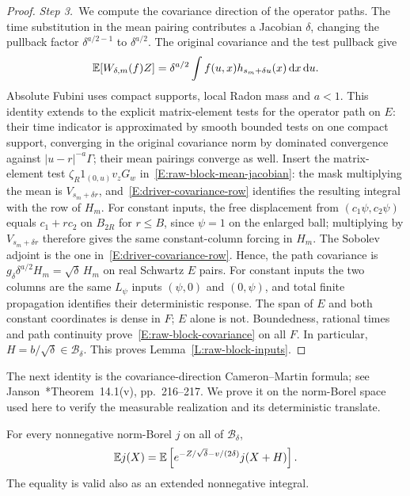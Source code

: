 \begin{proof}
  \medskip
  \noindent\textit{Step 3.~}We compute the covariance direction of the
  operator paths.
  The time substitution in the mean pairing contributes a Jacobian $\delta$,
  changing the pullback factor $\delta^{a/2-1}$ to $\delta^{a/2}$.
  The original covariance and the test pullback give
  \begin{equation}\label{E:raw-block-mean-jacobian}
    \mathbb{E}[W_{\delta,m}(f)Z]
    =\delta^{a/2}\int f(u,x)h_{s_m+\delta u}(x)\,\mathrm{d} x\,\mathrm{d} u.
  \end{equation}
  Absolute Fubini uses compact supports, local Radon mass and $a < 1$. This
  identity extends to the explicit matrix-element tests for the operator path on
  $E$: their time indicator is approximated by smooth bounded tests on one
  compact support, converging in the original covariance norm by dominated
  convergence against $|u-r|^{-a}\Gamma$; their mean pairings converge as well.
  Insert the matrix-element test $\zeta_R1_{(0,u)}v_zG_w$
  in~\eqref{E:raw-block-mean-jacobian}: the mask multiplying the mean is
  $V_{s_m+\delta r}$, and~\eqref{E:driver-covariance-row} identifies the
  resulting integral with the row of $H_m$.
  For constant inputs, the free displacement from $(c_1\psi,c_2\psi)$ equals
  $c_1+rc_2$ on $B_{2R}$ for $r\le B$, since $\psi=1$ on the enlarged ball;
  multiplying by $V_{s_m+\delta r}$ therefore gives the same constant-column
  forcing in $H_m$.
  The Sobolev adjoint is the one in~\eqref{E:driver-covariance-row}. Hence, the
  path covariance is $g_\delta\delta^{a/2}H_m = \sqrt\delta\,H_m$ on real
  Schwartz $E$ pairs. For constant inputs the two columns are the same $L_\psi$
  inputs $(\psi,0)$ and $(0,\psi)$, and total finite propagation identifies
  their deterministic response. The span of $E$ and both constant coordinates is
  dense in $F$; $E$ alone is not. Boundedness, rational times and path
  continuity prove~\eqref{E:raw-block-covariance} on all $F$. In particular, $H
  = b/\sqrt\delta \in \mathscr{B}_\delta$. This proves
  Lemma~\ref{L:raw-block-inputs}.
\end{proof}

The next identity is the covariance-direction Cameron--Martin formula;
see Janson~\cite{janson:97:gaussian}*{Theorem~14.1(v), pp.~216--217}.
We prove it on the norm-Borel space used here to verify the measurable
realization and its deterministic translate.

\begin{proposition}
  \label{P:raw-block-gaussian-law}
  For every nonnegative norm-Borel $j$ on all of $\mathscr{B}_\delta$,
  \begin{equation}\label{E:raw-block-gaussian-law}
    \mathbb{E} j(X)=
    \mathbb{E}\left[e^{-Z/\sqrt\delta-v/(2\delta)}j(X+H)\right].
  \end{equation}
  The equality is valid also as an extended nonnegative integral.
\end{proposition}

